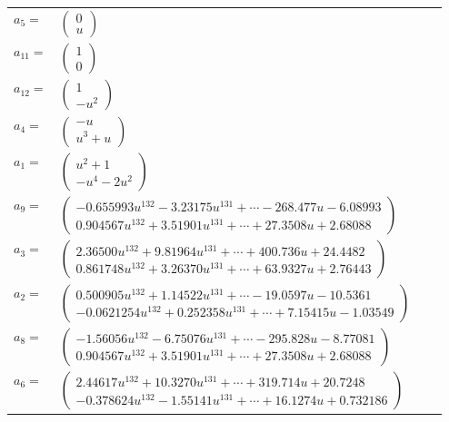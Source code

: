 \documentclass[1p]{elsarticle_modified}
\theoremstyle{definition}
\begin{document}
\begin{tabular}{m{7pt} m{180pt} m{7pt} m{180pt} }
\flushright $a_{5}=$&$\begin{pmatrix}0\\u\end{pmatrix}$ \\
\flushright $a_{11}=$&$\begin{pmatrix}1\\0\end{pmatrix}$ \\
\flushright $a_{12}=$&$\begin{pmatrix}1\\- u^2\end{pmatrix}$ \\
\flushright $a_{4}=$&$\begin{pmatrix}- u\\u^3+u\end{pmatrix}$ \\
\flushright $a_{1}=$&$\begin{pmatrix}u^2+1\\- u^4-2 u^2\end{pmatrix}$ \\
\flushright $a_{9}=$&$\begin{pmatrix}-0.655993 u^{132}-3.23175 u^{131}+\cdots-268.477 u-6.08993\\0.904567 u^{132}+3.51901 u^{131}+\cdots+27.3508 u+2.68088\end{pmatrix}$ \\
\flushright $a_{3}=$&$\begin{pmatrix}2.36500 u^{132}+9.81964 u^{131}+\cdots+400.736 u+24.4482\\0.861748 u^{132}+3.26370 u^{131}+\cdots+63.9327 u+2.76443\end{pmatrix}$ \\
\flushright $a_{2}=$&$\begin{pmatrix}0.500905 u^{132}+1.14522 u^{131}+\cdots-19.0597 u-10.5361\\-0.0621254 u^{132}+0.252358 u^{131}+\cdots+7.15415 u-1.03549\end{pmatrix}$ \\
\flushright $a_{8}=$&$\begin{pmatrix}-1.56056 u^{132}-6.75076 u^{131}+\cdots-295.828 u-8.77081\\0.904567 u^{132}+3.51901 u^{131}+\cdots+27.3508 u+2.68088\end{pmatrix}$ \\
\flushright $a_{6}=$&$\begin{pmatrix}2.44617 u^{132}+10.3270 u^{131}+\cdots+319.714 u+20.7248\\-0.378624 u^{132}-1.55141 u^{131}+\cdots+16.1274 u+0.732186\end{pmatrix}$ \\

\end{tabular}
\end{document}
